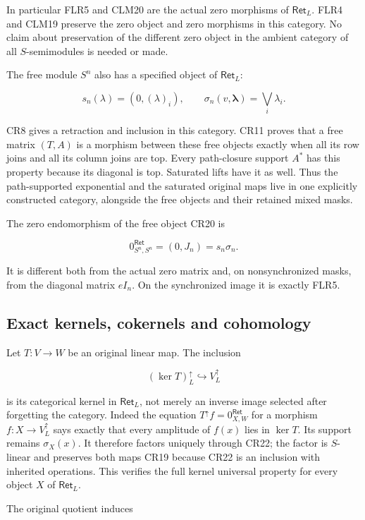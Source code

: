 \documentclass[11pt]{article}
\begin{document}
In particular FLR5 and CLM20 are the actual zero morphisms of \(\mathsf{Ret}_L\). FLR4 and CLM19 preserve the zero object and zero morphisms in this category. No claim about preservation of the different zero object in the ambient category of all \(S\)-semimodules is needed or made.

The free module \(S^n\) also has a specified object of \(\mathsf{Ret}_L\):

\[
s_n(\lambda)=(0,(\lambda)_i),\qquad
\sigma_n(v,\boldsymbol\lambda)=\bigvee_i\lambda_i.
\tag{CR20}
\]

CR8 gives a retraction and inclusion in this category. CR11 proves that a free matrix \((T,A)\) is a morphism between these free objects exactly when all its row joins and all its column joins are top. Every path-closure support \(A^*\) has this property because its diagonal is top. Saturated lifts have it as well. Thus the path-supported exponential and the saturated original maps live in one explicitly constructed category, alongside the free objects and their retained mixed masks.

The zero endomorphism of the free object CR20 is

\[
0^{\mathsf{Ret}}_{S^n,S^n}=(0,J_n)=s_n\sigma_n.
\tag{CR21}
\]

It is different both from the actual zero matrix and, on nonsynchronized masks, from the diagonal matrix \(eI_n\). On the synchronized image it is exactly FLR5.

\subsection{Exact kernels, cokernels and cohomology}

Let \(T:V\to W\) be an original linear map. The inclusion

\[
(\ker T)^\uparrow_L\hookrightarrow V^\uparrow_L
\tag{CR22}
\]

is its categorical kernel in \(\mathsf{Ret}_L\), not merely an inverse image selected after forgetting the category. Indeed the equation
\(T^\uparrow f=0^{\mathsf{Ret}}_{X,W}\) for a morphism \(f:X\to V^\uparrow_L\) says exactly that every amplitude of \(f(x)\) lies in \(\ker T\). Its support remains \(\sigma_X(x)\). It therefore factors uniquely through CR22; the factor is \(S\)-linear and preserves both maps CR19 because CR22 is an inclusion with inherited operations. This verifies the full kernel universal property for every object \(X\) of \(\mathsf{Ret}_L\).

The original quotient induces
\end{document}
